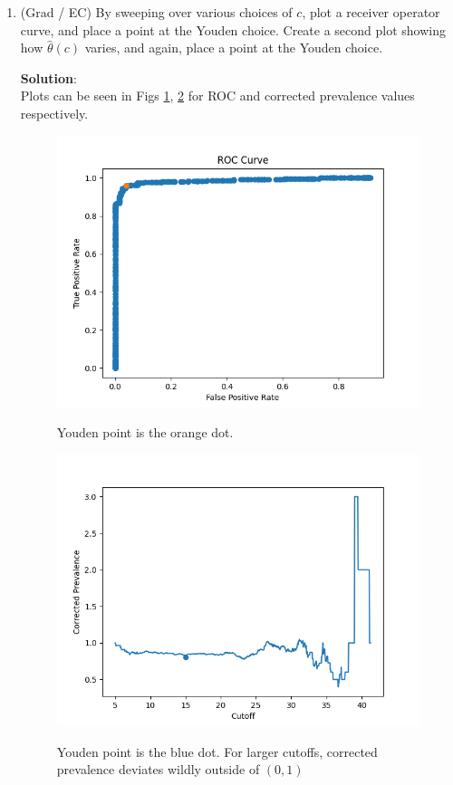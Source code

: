 \documentclass[11pt]{article}
\begin{document}
\begin{enumerate}
\begin{enumerate}[label=\alph*.]
	\item (Grad / EC) By sweeping over various choices of $c$, plot a receiver operator curve, and place a point at the Youden choice. Create a second plot showing how $\hat{\theta}(c)$ varies, and again, place a point at the Youden choice. 
	
	\begin{tcolorbox}[breakable]
		\textbf{Solution}:\\
		Plots can be seen in Figs \ref{fig:roc}, \ref{fig:corr_prev} for ROC and corrected prevalence values respectively.
	\end{tcolorbox}

	\begin{figure}
		\centering
		\includegraphics{roc.png}
		\label{fig:roc}
		\caption{Youden point is the orange dot.}
	\end{figure}

	\begin{figure}
	\centering
	\includegraphics{PrevOverCutoff.png}
	\label{fig:corr_prev}
	\caption{Youden point is the blue dot. For larger cutoffs, corrected prevalence deviates wildly outside of $(0,1)$}
\end{figure}
	

\end{enumerate}
\end{enumerate}
\end{document}
